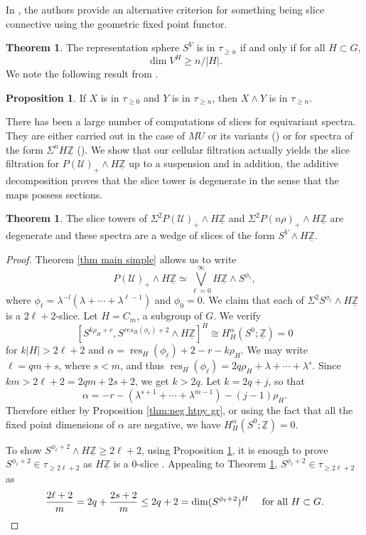 \documentclass[a4paper,leqno,11pt]{amsart}
\theoremstyle{plain}
\theoremstyle{definition}
\newtheorem{prop}[theorem]{Proposition}
\newtheorem{thm}[theorem]{Theorem}
\theoremstyle{remark}
\theoremstyle{definition}
\newcommand{\res}{\mathit{res}}
\newcommand{\uZ}{\underline{\mathbb{Z}}}
\def\lam{\lambda}
\numberwithin{equation}{section}
\newcommand{\smas}{\wedge}
\newcommand{\bigwedg}{\bigvee}
\renewcommand{\res}{\operatorname{res}}
\begin{document}
	In \cite{HillYarnall}, the authors provide an alternative criterion for something being slice connective using the geometric fixed point functor.
	\begin{thm}\cite[Theorem 3.2]{HillYarnall}\label{thm:HY} The representation sphere $ S^V $ is in $ \tau_{\ge n} $ if and only if for all $ H\subset G $,
		\[
		\dim V^H\ge n/|H|.
		\]
		We note the following result from \cite[Proposition 2.23]{Hill-sliceprimer}.
		\begin{prop}\label{prop:Hill-criterion}
			If $ X $ is in $ \tau_{\ge 0} $ and $ Y $ is in $ \tau_{\ge n} $, then $ X\smas Y $ is in $ \tau_{\ge n} $.
		\end{prop}		
	\end{thm}
	There has been a large number of computations of slices for equivariant spectra. They are either carried out in the case of $ MU $ or its variants (\cite{HHR,HHR-realKthy,HillShiWangXu}) or for spectra of the form $ \Sigma^n H\uZ $ (\cite{HHR-slicess,Yarnall-slice,GuillouYarnall, GhoshS-slice,Slone}). We show that our cellular filtration actually yields the slice filtration for $ P(\mathcal{U})_+\smas H\uZ $ up to a suspension and in addition, the additive decomposition proves that the slice tower is degenerate in the sense that the maps possess sections.
	\begin{thm}\label{thm:slice}
		The slice towers of $ \Sigma^2 P(\mathcal{U})_+\smas H\uZ $ and $ \Sigma^2 P(n\rho)_+\smas H\uZ $ are degenerate and these spectra are a wedge of slices of the form $ S^V\smas H\uZ $.
	\end{thm}
	\begin{proof}
		Theorem \ref{thm main simple} allows us to write  \[ P(\mathcal{U})_+\smas H\uZ \simeq \bigwedg_{\ell=0}^\infty H\uZ\smas S^{\phi_\ell},\]
		where  $ \phi_\ell=\lam^{-l}(\lambda+\cdots+\lambda^{\ell-1}) $ and $ \phi_0=0 $. We claim that each of $ \Sigma^2S^{\phi_\ell}\smas H\uZ $ is a $ 2\ell+2 $-slice. Let $ H=C_m $, a subgroup of $ G $. We verify
		\begin{equation*}\label{eq:umn2}
			[S^{k\rho_H+r}, S^{res_H(\phi_\ell)+2}\smas H\uZ]^H\cong
			H^{\alpha}_H(S^0;\uZ)=0
		\end{equation*}
		for  $ k|H|>2\ell+2 $ and  $ \alpha= \res_H(\phi_\ell)+2-r-k\rho_H$. We may write $ \ell  =qm +s$, where $ s<m $, and thus $ \res_H(\phi_\ell)=2q\rho_H+\lambda +\cdots +\lambda^s$. Since $ km>2\ell+2 = 2qm+2s+2$, we get $ k>2q $. Let $ k=2q+j $, so that
		$$\alpha= -r-(\lambda^{s+1}+\cdots+\lambda^{m-1})-(j-1)\rho_H.$$
		Therefore either by  Proposition \ref{thm:neg htpy gr}, or using  the fact that all the fixed point dimensions of $ \alpha $ are negative, we have  $ H^{\alpha}_H(S^0;\uZ)=0 $.\par
		To show $ S^{\phi_\ell+2}\smas H\uZ \ge 2\ell+2 $, using Proposition \ref{prop:Hill-criterion}, it is enough to prove $ S^{\phi_\ell+2}\in \tau_{\ge 2\ell+2}$ as $H\uZ $ is a $ 0 $-slice \cite[Proposition 4.50]{HHR}. Appealing to Theorem \ref{thm:HY},  $ S^{\phi_\ell+2}\in \tau_{\ge 2\ell+2}$ as
		\[
		\frac{2\ell+2}{m}=2q+\frac{2s+2}{m}\le 2q+2=\dim( S^{\phi_\ell+2})^H \quad \textup{~for all~} H\subset G.
		\]
	\end{proof}
\end{document}
